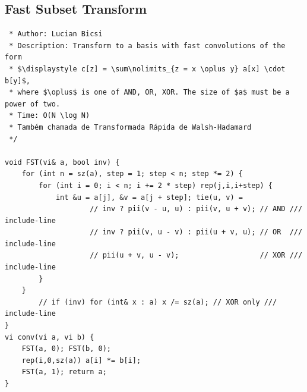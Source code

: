 \documentclass[11pt, a4paper, twoside]{article}
\begin{document}
\subsection{Fast Subset Transform}
\begin{verbatim}
 * Author: Lucian Bicsi
 * Description: Transform to a basis with fast convolutions of the form
 * $\displaystyle c[z] = \sum\nolimits_{z = x \oplus y} a[x] \cdot b[y]$,
 * where $\oplus$ is one of AND, OR, XOR. The size of $a$ must be a power of two.
 * Time: O(N \log N)
 * Também chamada de Transformada Rápida de Walsh-Hadamard
 */

void FST(vi& a, bool inv) {
	for (int n = sz(a), step = 1; step < n; step *= 2) {
		for (int i = 0; i < n; i += 2 * step) rep(j,i,i+step) {
			int &u = a[j], &v = a[j + step]; tie(u, v) =
    				// inv ? pii(v - u, u) : pii(v, u + v); // AND /// include-line
    				// inv ? pii(v, u - v) : pii(u + v, u); // OR  /// include-line
    				// pii(u + v, u - v);                   // XOR /// include-line
		}
	}
    	// if (inv) for (int& x : a) x /= sz(a); // XOR only /// include-line
}
vi conv(vi a, vi b) {
	FST(a, 0); FST(b, 0);
	rep(i,0,sz(a)) a[i] *= b[i];
	FST(a, 1); return a;
}
\end{verbatim}
\end{document}
